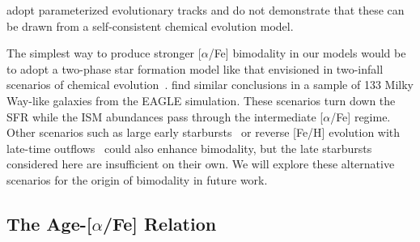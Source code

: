 adopt parameterized evolutionary tracks and do not demonstrate that these can 
be drawn from a self-consistent chemical evolution model. 
\par 
The simplest way to produce stronger [$\alpha$/Fe] bimodality in our models 
would be to adopt a two-phase star formation model like that envisioned in 
two-infall scenarios of chemical evolution~\citep[e.g.][]{Chiappini1997, 
Chiappini2001, Romano2010, Grisoni2017, Noguchi2018, Palla2020, Spitoni2016, 
Spitoni2018, Spitoni2019, Spitoni2020, Spitoni2021}. 
\citet{Mackereth2018} find similar conclusions in a sample of 133 Milky 
Way-like galaxies from the EAGLE simulation.
These scenarios turn down the SFR while the ISM abundances pass through the 
intermediate [$\alpha$/Fe] regime. 
Other scenarios such as large early starbursts~\citep{Clarke2019} or reverse 
[Fe/H] evolution with late-time outflows~\citep{Weinberg2017b} could also 
enhance bimodality, but the late starbursts considered here are insufficient 
on their own. 
We will explore these alternative scenarios for the origin of bimodality in 
future work. 

\subsection{The Age-[$\alpha$/Fe] Relation} 
\label{migration:sec:obs_comp:age_alpha} 


